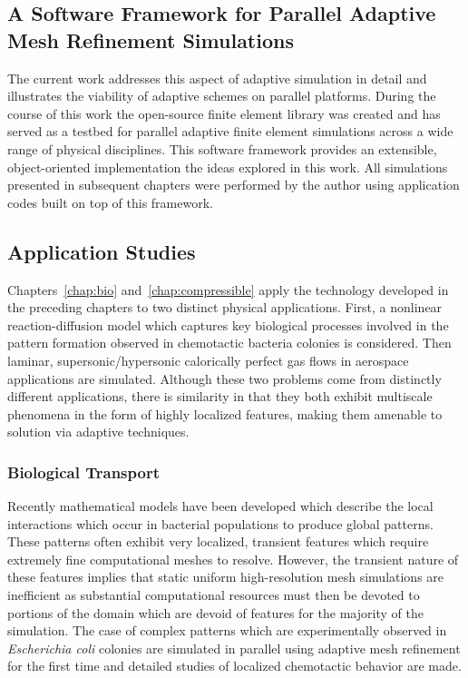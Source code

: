 \subsection{A Software Framework for Parallel Adaptive Mesh Refinement Simulations}
The current work addresses this aspect of adaptive simulation in detail and illustrates the viability of adaptive schemes on parallel platforms.  During the course of this work the open-source finite element library \libMesh{} was created and has served as a testbed for parallel adaptive finite element simulations across a wide range of physical disciplines.  This software framework provides an extensible, object-oriented implementation the ideas explored in this work.  All simulations presented in subsequent chapters were performed by the author using application codes built on top of this framework.

\subsection{Application Studies}
Chapters~\ref{chap:bio} and~\ref{chap:compressible} apply the technology developed in the preceding chapters to two distinct physical applications.  First, a nonlinear reaction-diffusion model which captures key biological processes involved in the pattern formation observed in chemotactic bacteria colonies is considered.  Then laminar, supersonic/hypersonic calorically perfect gas flows in aerospace applications are simulated.  Although these two problems come from distinctly different applications, there is similarity in that they both exhibit multiscale phenomena in the form of highly localized features, making them amenable to solution via adaptive techniques.

\subsubsection{Biological Transport}
Recently mathematical models have been developed which describe the local interactions which occur in bacterial populations to produce global patterns.  These patterns often exhibit very localized, transient features which require extremely fine computational meshes to resolve.  However, the transient nature of these features implies that static uniform high-resolution mesh simulations are inefficient as substantial computational resources must then be devoted to portions of the domain which are devoid of features for the majority of the simulation.  The case of complex patterns which are experimentally observed in \emph{Escherichia coli} colonies are simulated in parallel using adaptive mesh refinement for the first time and detailed studies of localized chemotactic behavior are made.


